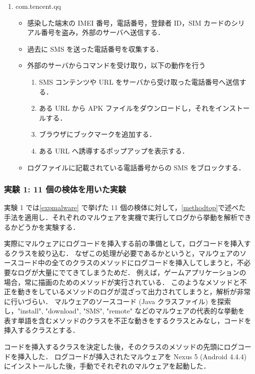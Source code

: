 \begin{enumerate}
\item com.tencent.qq
	\begin{itemize}
	\item 感染した端末の IMEI 番号，電話番号，登録者 ID，SIM カードのシリアル番号を盗み，外部のサーバへ送信する．
	\item 過去に SMS を送った電話番号を収集する．
	\item 外部のサーバからコマンドを受け取り，以下の動作を行う
	\begin{enumerate}
		\item SMS コンテンツや URL をサーバから受け取った電話番号へ送信する．
		\item ある URL から APK ファイルをダウンロードし，それをインストールする．
		\item ブラウザにブックマークを追加する．
		\item ある URL へ誘導するポップアップを表示する．
	\end{enumerate}
	\item ログファイルに記載されている電話番号からの SMS をブロックする．
	\end{itemize}
\end{enumerate}

\subsubsection{実験 1: 11 個の検体を用いた実験}
\label{exp1}
実験 1 では\ref{expmalware} で挙げた 11 個の検体に対して，\ref{methodtop}で述べた手法を適用し．それぞれのマルウェアを実機で実行してログから挙動を解析できるかどうかを実験する．

実際にマルウェアにログコードを挿入する前の準備として，ログコードを挿入するクラスを絞り込む．
なぜこの処理が必要であるかというと，マルウェアのソースコード中の全てのクラスのメソッドにログコードを挿入してしまうと，不必要なログが大量にでてきてしまうためだ．
例えば，ゲームアプリケーションの場合，常に描画のためのメソッドが実行されている．
このようなメソッドと不正を動きをしているメソッドのログが混ざって出力されてしまうと，解析が非常に行いづらい．
マルウェアのソースコード (Java クラスファイル) を探索し，"install", "download", "SMS", "remote" などのマルウェアの代表的な挙動を表す単語を含むメソッドのクラスを不正な動きをするクラスとみなし，コードを挿入するクラスとする．

コードを挿入するクラスを決定した後，そのクラスのメソッドの先頭にログコードを挿入した．
ログコードが挿入されたマルウェアを Nexus 5 (Android 4.4.4) にインストールした後，手動でそれぞれのマルウェアを起動した．

